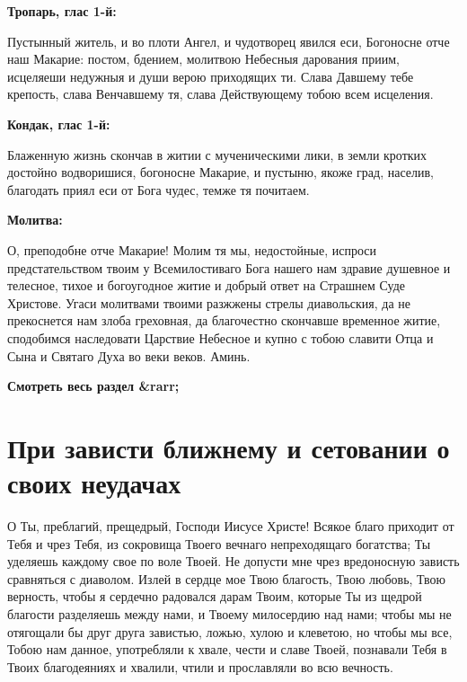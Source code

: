 \bfseries Тропарь, глас 1-й:\normalfont{}


Пустынный житель, и во плоти Ангел, и чудотворец явился еси, Богоносне отче наш Макарие: постом, бдением, молитвою Небесныя дарования приим, исцеляеши недужныя и души верою приходящих ти. Слава Давшему тебе крепость, слава Венчавшему тя, слава Действующему тобою всем исцеления.


\medskip


\bfseries Кондак, глас 1-й:\normalfont{}


Блаженную жизнь скончав в житии с мученическими лики, в земли кротких достойно водворишися, богоносне Макарие, и пустыню, якоже град, населив, благодать приял еси от Бога чудес, темже тя почитаем.


\medskip


\bfseries Молитва:\normalfont{}


О, преподобне отче Макарие!  Молим тя мы, недостойные, испроси предстательством твоим у Всемилостиваго Бога нашего нам здравие душевное и телесное, тихое и богоугодное житие  и добрый ответ на Страшнем Суде Христове. Угаси молитвами твоими разжжены стрелы диавольския, да не прекоснется нам злоба греховная, да благочестно скончавше временное житие, сподобимся наследовати Царствие Небесное и купно с тобою славити Отца и Сына и Святаго Духа во веки веков. Аминь.


\mychapterending


\bfseries Смотреть весь раздел &rarr;\normalfont{} 

\section{При зависти ближнему и сетовании о своих неудачах}
 


О Ты, преблагий, прещедрый, Господи Иисусе Христе! Всякое благо приходит от Тебя и чрез Тебя, из сокровища Твоего вечнаго непреходящаго богатства; Ты уделяешь каждому свое по воле Твоей. Не допусти мне чрез вредоносную зависть сравняться с диаволом. Излей в сердце мое Твою благость, Твою любовь, Твою верность, чтобы я сердечно радовался дарам Твоим, которые Ты из щедрой благости разделяешь между нами, и Твоему милосердию над нами; чтобы мы не отягощали бы друг друга завистью, ложью, хулою и клеветою, но чтобы мы все, Тобою нам данное, употребляли к хвале, чести и славе Твоей, познавали Тебя в Твоих благодеяниях и хвалили, чтили и прославляли во всю вечность.


